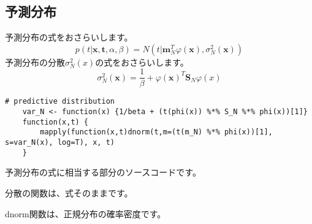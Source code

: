 \documentclass[uplatex]{jsarticle}
\begin{document}
\subsection{予測分布}
予測分布の式をおさらいします。
\begin{equation}
p(t|\mathbf{x},\mathbf{t},α,β)=\mathit{N}(t|\mathbf{m}^{T}_{N}φ(\mathbf{x}),σ^{2}_{N}(\mathbf{x}))
\end{equation}
予測分布の分散$σ^2_N(x)$の式をおさらいします。
\begin{equation}
σ^2_N(\mathbf{x})=\frac{1}{β}+φ(\mathbf{x})^T\mathbf{S}_Nφ(x)
\end{equation}
\begin{lstlisting}[basicstyle=\ttfamily\footnotesize, frame=single]
    # predictive distribution
    var_N <- function(x) {1/beta + (t(phi(x)) %*% S_N %*% phi(x))[1]}
    function(x,t) {
        mapply(function(x,t)dnorm(t,m=(t(m_N) %*% phi(x))[1], s=var_N(x), log=T), x, t)
    }
\end{lstlisting}

予測分布の式に相当する部分のソースコードです。\par
分散の関数は、式そのままです。\par
dnorm関数は、正規分布の確率密度です。
\end{document}
